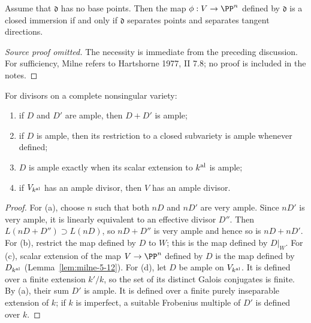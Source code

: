 \begin{proposition}
\label{prop:milne-6-3}

Assume that $\mathfrak d$ has no base points.  Then the map
$\phi:V\to\PP^n$ defined by $\mathfrak d$ is a closed immersion if and only if
$\mathfrak d$ separates points and separates tangent directions.
\end{proposition}

\begin{proof}[Source proof omitted]
The necessity is immediate from the preceding discussion.  For sufficiency,
Milne refers to Hartshorne 1977, II 7.8; no proof is included in the notes.
\end{proof}


\begin{proposition}
\label{prop:milne-6-6}

For divisors on a complete nonsingular variety:
\begin{enumerate}
\item if $D$ and $D'$ are ample, then $D+D'$ is ample;
\item if $D$ is ample, then its restriction to a closed subvariety is ample
whenever defined;
\item $D$ is ample exactly when its scalar extension to $k^{\rm al}$ is ample;
\item if $V_{k^{\rm al}}$ has an ample divisor, then $V$ has an ample divisor.
\end{enumerate}
\end{proposition}

\begin{proof}
For (a), choose $n$ such that both $nD$ and $nD'$ are very ample.  Since
$nD'$ is very ample, it is linearly equivalent to an effective divisor $D''$.
Then $L(nD+D'')\supset L(nD)$, so $nD+D''$ is very ample and hence so is
$nD+nD'$.  For (b), restrict the map defined by $D$ to $W$; this is the map
defined by $D|_W$.  For (c), scalar extension of the map $V\to\PP^n$ defined
by $D$ is the map defined by $D_{k^{\rm al}}$ (Lemma~\ref{lem:milne-5-12}).
For (d), let $D$ be ample on $V_{k^{\rm al}}$.  It is defined over a finite
extension $k'/k$, so the set of its distinct Galois conjugates is finite.  By
(a), their sum $D'$ is ample.  It is defined over a finite purely inseparable
extension of $k$; if $k$ is imperfect, a suitable Frobenius multiple of $D'$
is defined over $k$.
\end{proof}


